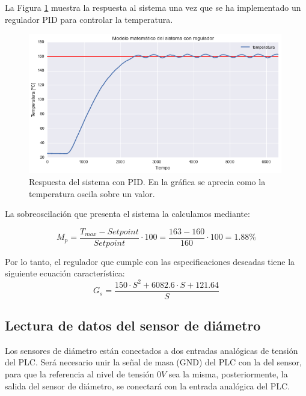 La Figura \ref{fig:plc_PID4} muestra la respuesta al sistema una vez que se ha implementado un regulador PID para controlar la temperatura.

\begin{figure}[H]
    \centering
    \includegraphics[width=0.99\textwidth]{images/PLC/modelado/modelado_38_1.png}
    \caption[Respuesta del sistema con PID.]{Respuesta del sistema con PID. En la gráfica se aprecia como la temperatura oscila sobre un valor.}
    \label{fig:plc_PID4}
\end{figure}

La sobreoscilación que presenta el sistema la calculamos mediante:

\begin{equation}
M_{p}=\frac{T_{max}-Setpoint}{Setpoint} \cdot 100 = \frac{163-160}{160} \cdot 100 = 1.88\%
\end{equation}

Por lo tanto, el regulador que cumple con las especificaciones deseadas tiene la siguiente ecuación característica:
\begin{equation}
G_s = \frac{150 \cdot S^2 + 6082.6 \cdot S + 121.64}{S}
\end{equation}


\subsection{Lectura de datos del sensor de diámetro}
\label{sec:plc_diametro}

Los sensores de diámetro están conectados a dos entradas analógicas de tensión del PLC. Será necesario unir la señal de masa (GND) del PLC con la del sensor, para que la referencia al nivel de tensión $0 V$ sea la misma, posteriormente, la salida del sensor de diámetro, se conectará con la entrada analógica del PLC.\\

